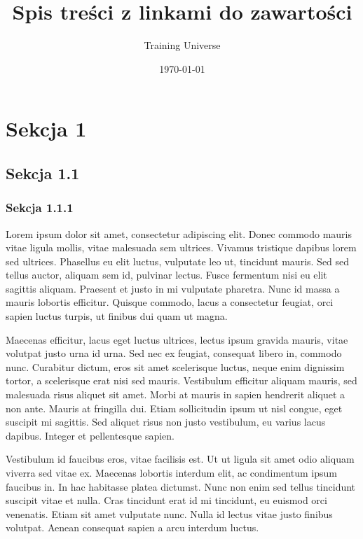 \documentclass[11pt,a4paper]{article}
\author{Training Universe}
\date{\today}
\title{Spis treści z linkami do zawartości}
\begin{document}
\maketitle

\newpage
\tableofcontents
\newpage


\section{Sekcja 1}
\label{sec:Sekcja 1}

\subsection{Sekcja 1.1}
\label{subsec:Sekcja 1.1}

\subsubsection{Sekcja 1.1.1}
\label{subsubsec:Sekcja 1.1.1}

Lorem ipsum dolor sit amet, consectetur adipiscing elit. Donec commodo mauris vitae ligula mollis, vitae malesuada sem ultrices. Vivamus tristique dapibus lorem sed ultrices. Phasellus eu elit luctus, vulputate leo ut, tincidunt mauris. Sed sed tellus auctor, aliquam sem id, pulvinar lectus. Fusce fermentum nisi eu elit sagittis aliquam. Praesent et justo in mi vulputate pharetra. Nunc id massa a mauris lobortis efficitur. Quisque commodo, lacus a consectetur feugiat, orci sapien luctus turpis, ut finibus dui quam ut magna.

Maecenas efficitur, lacus eget luctus ultrices, lectus ipsum gravida mauris, vitae volutpat justo urna id urna. Sed nec ex feugiat, consequat libero in, commodo nunc. Curabitur dictum, eros sit amet scelerisque luctus, neque enim dignissim tortor, a scelerisque erat nisi sed mauris. Vestibulum efficitur aliquam mauris, sed malesuada risus aliquet sit amet. Morbi at mauris in sapien hendrerit aliquet a non ante. Mauris at fringilla dui. Etiam sollicitudin ipsum ut nisl congue, eget suscipit mi sagittis. Sed aliquet risus non justo vestibulum, eu varius lacus dapibus. Integer et pellentesque sapien.

Vestibulum id faucibus eros, vitae facilisis est. Ut ut ligula sit amet odio aliquam viverra sed vitae ex. Maecenas lobortis interdum elit, ac condimentum ipsum faucibus in. In hac habitasse platea dictumst. Nunc non enim sed tellus tincidunt suscipit vitae et nulla. Cras tincidunt erat id mi tincidunt, eu euismod orci venenatis. Etiam sit amet vulputate nunc. Nulla id lectus vitae justo finibus volutpat. Aenean consequat sapien a arcu interdum luctus.
\end{document}
